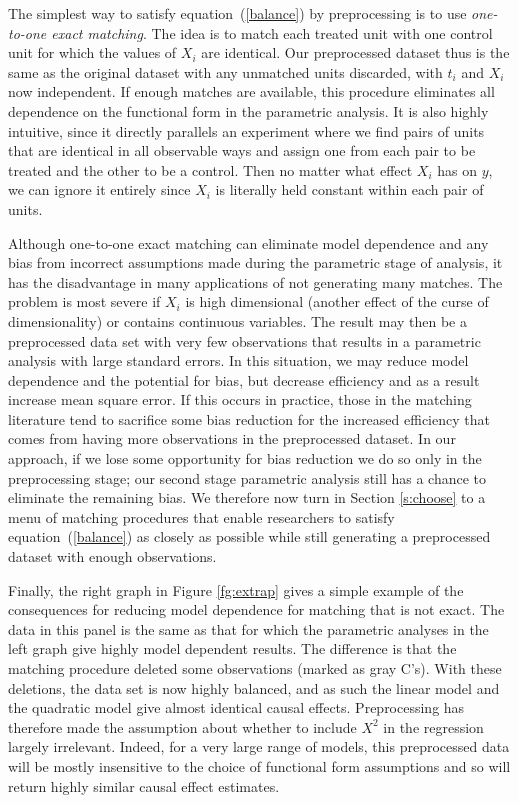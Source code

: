 \documentclass[11pt,titlepage]{article}
\begin{document}
The simplest way to satisfy equation~(\ref{balance}) by preprocessing
is to use \emph{one-to-one exact matching}.  The idea is to match each
treated unit with one control unit for which the values of $X_i$ are
identical.  Our preprocessed dataset thus is the same as the original
dataset with any unmatched units discarded, with $t_i$ and $X_i$ now
independent.  If enough matches are available, this procedure
eliminates all dependence on the functional form in the parametric
analysis.  It is also highly intuitive, since it directly parallels an
experiment where we find pairs of units that are identical in all
observable ways and assign one from each pair to be treated and the
other to be a control.  Then no matter what effect $X_i$ has on $y$,
we can ignore it entirely since $X_i$ is literally held constant
within each pair of units.

Although one-to-one exact matching can eliminate model dependence and
any bias from incorrect assumptions made during the parametric stage
of analysis, it has the disadvantage in many applications of not
generating many matches.  The problem is most severe if $X_i$ is high
dimensional (another effect of the curse of dimensionality) or
contains continuous variables.  The result may then be a preprocessed
data set with very few observations that results in a parametric
analysis with large standard errors.  In this situation, we may reduce
model dependence and the potential for bias, but decrease efficiency
and as a result increase mean square error.  If this occurs in
practice, those in the matching literature tend to sacrifice some bias
reduction for the increased efficiency that comes from having more
observations in the preprocessed dataset.  In our approach, if we lose
some opportunity for bias reduction we do so only in the preprocessing
stage; our second stage parametric analysis still has a chance to
eliminate the remaining bias.  We therefore now turn in Section
\ref{s:choose} to a menu of matching procedures that enable
researchers to satisfy equation~(\ref{balance}) as closely as possible
while still generating a preprocessed dataset with enough
observations.

Finally, the right graph in Figure \ref{fg:extrap} gives a simple
example of the consequences for reducing model dependence for matching
that is not exact.  The data in this panel is the same as that for
which the parametric analyses in the left graph give highly model
dependent results.  The difference is that the matching procedure
deleted some observations (marked as gray C's).  With these deletions,
the data set is now highly balanced, and as such the linear model and
the quadratic model give almost identical causal effects.
Preprocessing has therefore made the assumption about whether to
include $X^2$ in the regression largely irrelevant.  Indeed, for a
very large range of models, this preprocessed data will be mostly
insensitive to the choice of functional form assumptions and so will
return highly similar causal effect estimates.
\end{document}
